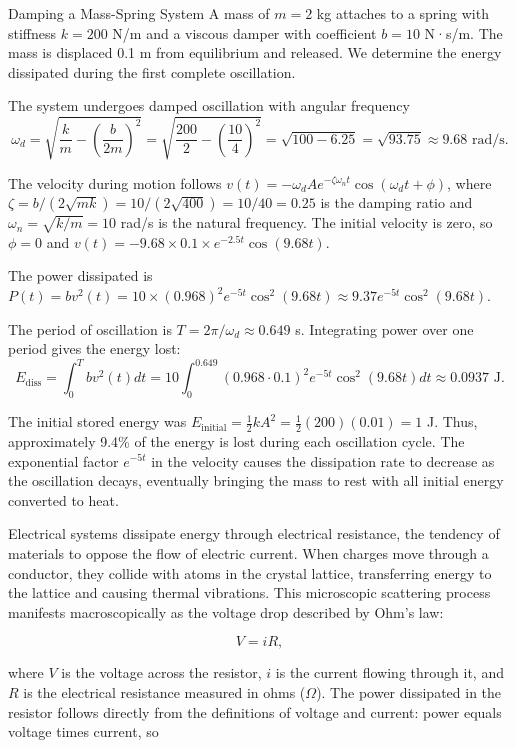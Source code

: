 \begin{example}{Damping a Mass-Spring System}
A mass of $m = 2$ kg attaches to a spring with stiffness $k = 200$ N/m and a viscous damper with coefficient $b = 10$ N·s/m. The mass is displaced 0.1 m from equilibrium and released. We determine the energy dissipated during the first complete oscillation.

The system undergoes damped oscillation with angular frequency
$$\omega_d = \sqrt{\frac{k}{m} - \left(\frac{b}{2m}\right)^2} = \sqrt{\frac{200}{2} - \left(\frac{10}{4}\right)^2} = \sqrt{100 - 6.25} = \sqrt{93.75} \approx 9.68 \text{ rad/s}.$$

The velocity during motion follows $v(t) = -\omega_d A e^{-\zeta\omega_n t} \cos(\omega_d t + \phi)$, where $\zeta = b/(2\sqrt{mk}) = 10/(2\sqrt{400}) = 10/40 = 0.25$ is the damping ratio and $\omega_n = \sqrt{k/m} = 10$ rad/s is the natural frequency. The initial velocity is zero, so $\phi = 0$ and $v(t) = -9.68 \times 0.1 \times e^{-2.5t} \cos(9.68t)$.

The power dissipated is $P(t) = b v^2(t) = 10 \times (0.968)^2 e^{-5t} \cos^2(9.68t) \approx 9.37 e^{-5t} \cos^2(9.68t)$.

The period of oscillation is $T = 2\pi/\omega_d \approx 0.649$ s. Integrating power over one period gives the energy lost:
$$E_{\text{diss}} = \int_0^T b v^2(t)  dt = 10 \int_0^{0.649} (0.968 \cdot 0.1)^2 e^{-5t} \cos^2(9.68t)  dt \approx 0.0937 \text{ J}.$$

The initial stored energy was $E_{\text{initial}} = \frac{1}{2}kA^2 = \frac{1}{2}(200)(0.01) = 1$ J. Thus, approximately 9.4\% of the energy is lost during each oscillation cycle. The exponential factor $e^{-5t}$ in the velocity causes the dissipation rate to decrease as the oscillation decays, eventually bringing the mass to rest with all initial energy converted to heat.
\end{example}

Electrical systems dissipate energy through electrical resistance, the tendency of materials to oppose the flow of electric current. When charges move through a conductor, they collide with atoms in the crystal lattice, transferring energy to the lattice and causing thermal vibrations. This microscopic scattering process manifests macroscopically as the voltage drop described by Ohm's law:

$$V = i R,$$

where $V$ is the voltage across the resistor, $i$ is the current flowing through it, and $R$ is the electrical resistance measured in ohms ($\Omega$). The power dissipated in the resistor follows directly from the definitions of voltage and current: power equals voltage times current, so

